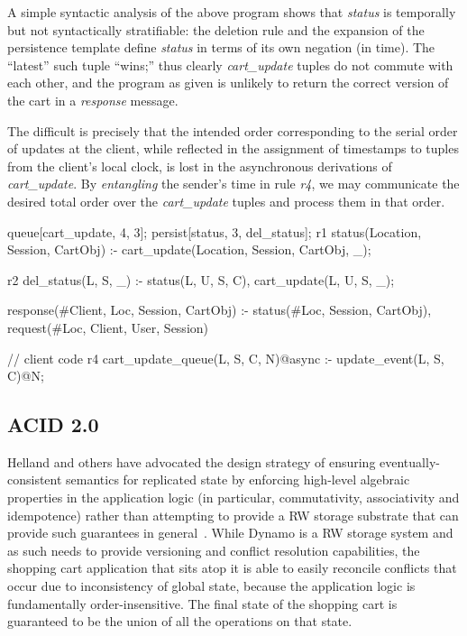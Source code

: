 A simple syntactic analysis of the above program shows that {\em status} 
is temporally but not syntactically stratifiable: the deletion rule and the expansion of the
persistence template define {\em status} in terms of its own negation (in time).  The ``latest''
such tuple ``wins;'' thus clearly {\em cart\_update} tuples do not commute with each other,
and the program as given is unlikely to return the correct version of the cart in a {\em response}
message.

The difficult is precisely that the intended order corresponding to the serial order of updates
at the client, while reflected in the assignment of timestamps to tuples from the client's
local clock, is lost in the asynchronous derivations of {\em cart\_update}.  By \emph{entangling}
the sender's time in rule  {\em r4}, we may communicate the desired total order over 
the {\em cart\_update} tuples and process them in that order.  

\begin{Dedalus}
queue[cart_update, 4, 3];
persist[status, 3, del_status];
r1
status(Location, Session, CartObj) :-
    cart_update(Location,  Session, CartObj, _);
    
r2
del_status(L, S, _) :-
    status(L, U, S, C),
    cart_update(L, U, S, _);

response(#Client, Loc, Session, CartObj) :-
    status(#Loc, Session, CartObj),
    request(#Loc, Client, User, Session)

// client code
r4
cart_update_queue(L, S, C, N)@async :- 
    update_event(L, S, C)@N;

\end{Dedalus}

\subsection{ACID 2.0}

Helland and others have advocated the design strategy of ensuring eventually-consistent 
semantics for replicated state by enforcing high-level algebraic 
properties in the application logic (in particular, commutativity, associativity and 
idempotence) rather than attempting to provide a RW storage substrate that can provide
such guarantees in general~\cite{quicksand, beyond}.  While Dynamo is a RW storage system
and as such needs to provide versioning and conflict resolution capabilities, the shopping
cart application that sits atop it is able to easily reconcile conflicts that occur due to inconsistency of global state, because the application logic is fundamentally order-insensitive.
The final state of the shopping cart is guaranteed to be the union of all the operations on
that state.